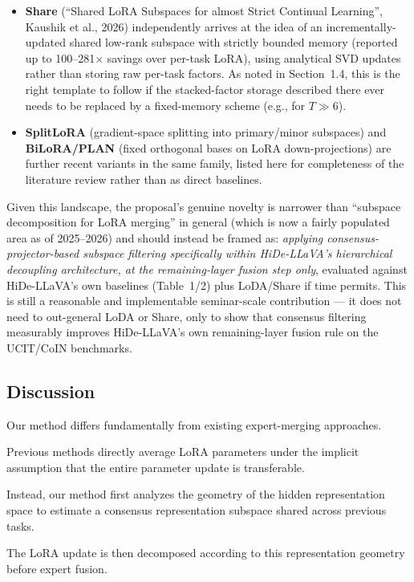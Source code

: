 \documentclass[a4paper]{article}
\begin{document}
\begin{itemize}
\item \textbf{Share} (``Shared LoRA Subspaces for almost Strict Continual Learning'', Kaushik et al., 2026) independently arrives at the idea of an incrementally-updated shared low-rank subspace with strictly bounded memory (reported up to 100--281$\times$ savings over per-task LoRA), using analytical SVD updates rather than storing raw per-task factors. As noted in Section~1.4, this is the right template to follow if the stacked-factor storage described there ever needs to be replaced by a fixed-memory scheme (e.g., for $T\gg 6$).
\item \textbf{SplitLoRA} (gradient-space splitting into primary/minor subspaces) and \textbf{BiLoRA/PLAN} (fixed orthogonal bases on LoRA down-projections) are further recent variants in the same family, listed here for completeness of the literature review rather than as direct baselines.
\end{itemize}

Given this landscape, the proposal's genuine novelty is narrower than ``subspace decomposition for LoRA merging'' in general (which is now a fairly populated area as of 2025--2026) and should instead be framed as: \emph{applying consensus-projector-based subspace filtering specifically within HiDe-LLaVA's hierarchical decoupling architecture, at the remaining-layer fusion step only}, evaluated against HiDe-LLaVA's own baselines (Table~1/2) plus LoDA/Share if time permits. This is still a reasonable and implementable seminar-scale contribution — it does not need to out-general LoDA or Share, only to show that consensus filtering measurably improves HiDe-LLaVA's own remaining-layer fusion rule on the UCIT/CoIN benchmarks.

\subsection{Discussion}

Our method differs fundamentally from existing expert-merging approaches.

Previous methods directly average LoRA parameters under the implicit assumption that the entire parameter update is transferable.

Instead, our method first analyzes the geometry of the hidden representation space to estimate a consensus representation subspace shared across previous tasks.

The LoRA update is then decomposed according to this representation geometry before expert fusion.
\end{document}
